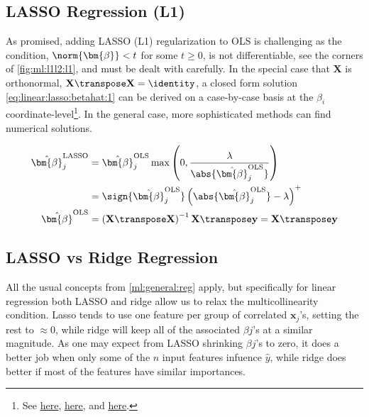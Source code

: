 \subsection{LASSO Regression (L1)}
\label{regression:linear:lasso}

As promised, adding LASSO (L1) regularization to OLS is challenging
as the condition, $\norm{\bm{\beta}} < t$ for some $t \geq 0$,
is not differentiable, see the corners of \cref{fig:ml:l1l2:l1}, and must be dealt with carefully.
In the special case that $\mathbf{X}$ is orthonormal, $\mathbf{X}\transpose \mathbf{X} = \identity$,
a closed form solution \cref{eq:linear:lasso:betahat:1} can be derived on a case-by-case basis
at the $\beta_{i}$ coordinate-level\footnote{See \href{https://stats.stackexchange.com/questions/17781/derivation-of-closed-form-lasso-solution}{here},
\href{https://en.wikipedia.org/wiki/Lasso_(statistics)\#Orthonormal_covariates}{here},
and \href{https://xavierbourretsicotte.github.io/lasso_derivation.html}{here}.}.
In the general case, more sophisticated methods can find numerical solutions.

\begin{subequations} \label{eq:linear:lasso:betahat_all}
\begin{align}
\hat{\bm{\beta}}^{\text{LASSO}}_{j}
&= \hat{\bm{\beta}}^{\text{OLS}}_{j} \max\left(0, \frac{\lambda}{\abs{\hat{\bm{\beta}}^{\text{OLS}}_{j}}}\right) \label{eq:linear:lasso:betahat:1} \\
&= \sign{\hat{\bm{\beta}}^{\text{OLS}}_{j}} \left(\abs{\hat{\bm{\beta}}^{\text{OLS}}_{j}} - \lambda\right)^{+} \label{eq:linear:lasso:betahat:2} \\
\hat{\bm{\beta}}^{\text{OLS}}
&= \left(\mathbf{X}\transpose\mathbf{X}\right)^{-1}\mathbf{X}\transpose \mathbf{y}
= \mathbf{X}\transpose \mathbf{y} \label{eq:lasso:modified_betahat_OLS}
\end{align}
\end{subequations}

\subsection{LASSO vs Ridge Regression}
\label{regression:linear:lasso_vs_ridge}

All the usual concepts from \cref{ml:general:reg} apply, but specifically for linear regression
both LASSO and ridge allow us to relax the multicollinearity condition.
Lasso tends to use one feature per group of correlated $\mathbf{x}_{j}$'s, setting the rest to $\approx 0$,
while ridge will keep all of the associated $\beta{j}$'s at a similar magnitude.
As one may expect from LASSO shrinking $\beta{j}$'s to zero,
it does a better job when only some of the $n$ input features infuence $\hat{y}$,
while ridge does better if most of the features have similar importances.

